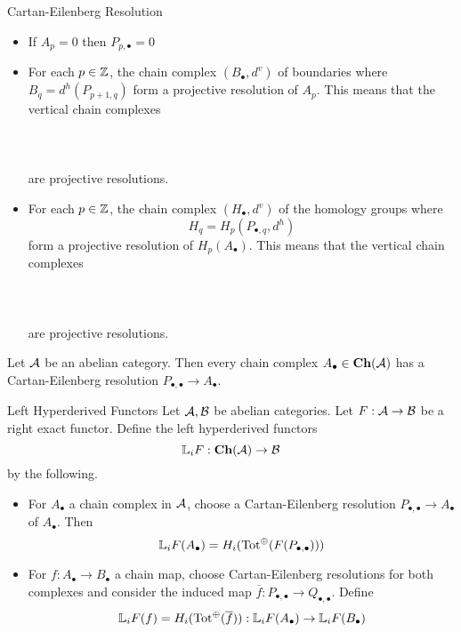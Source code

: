 \documentclass[a4paper]{article}
\begin{document}
\begin{defn}{Cartan-Eilenberg Resolution}{}
\begin{itemize}
\item If $A_p=0$ then $P_{p,\bullet}=0$
\item For each $p\in\mathbb{Z}$, the chain complex $(B_\bullet,d^v)$ of boundaries where $B_q=d^h(P_{p+1,q})$ form a projective resolution of $A_p$. This means that the vertical chain complexes \\~\\
\\~\\
are projective resolutions. 
\item For each $p\in\mathbb{Z}$, the chain complex $(H_\bullet,d^v)$ of the homology groups where $$H_q=H_p(P_{\bullet,q},d^h)$$ form a projective resolution of $H_p(A_\bullet)$. This means that the vertical chain complexes \\~\\
\\~\\
are projective resolutions. 
\end{itemize}
\end{defn}

\begin{thm}{}{} Let $\mathcal{A}$ be an abelian category. Then every chain complex $A_\bullet\in\bold{Ch}(\mathcal{A})$ has a Cartan-Eilenberg resolution $P_{\bullet,\bullet}\to A_\bullet$. 
\end{thm}

\begin{defn}{Left Hyperderived Functors}{} Let $\mathcal{A},\mathcal{B}$ be abelian categories. Let $F:\mathcal{A}\to\mathcal{B}$ be a right exact functor. Define the left hyperderived functors $$\mathbb{L}_i F:\bold{Ch}(\mathcal{A})\to\mathcal{B}$$ by the following. 
\begin{itemize}
\item For $A_\bullet$ a chain complex in $\mathcal{A}$, choose a Cartan-Eilenberg resolution $P_{\bullet,\bullet}\to A_\bullet$ of $A_\bullet$. Then $$\mathbb{L}_i F(A_\bullet)=H_i(\text{Tot}^\oplus(F(P_{\bullet,\bullet})))$$
\item For $f:A_\bullet\to B_\bullet$ a chain map, choose Cartan-Eilenberg resolutions for both complexes and consider the induced map $\overline{f}:P_{\bullet,\bullet}\to Q_{\bullet,\bullet}$. Define $$\mathbb{L}_i F(f)=H_i(\text{Tot}^\oplus(\overline{f})):\mathbb{L}_iF(A_\bullet)\to\mathbb{L}_iF(B_\bullet)$$
\end{itemize}
\end{defn}
\end{document}
